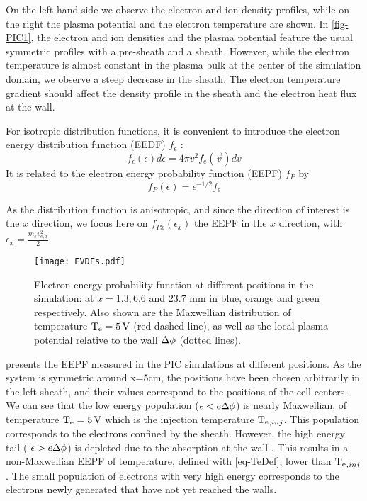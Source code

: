    On the left-hand side we observe the electron and ion density profiles, while on the right the plasma potential and the electron temperature are shown.
    In \cref{fig-PIC1}, the electron and ion densities and the plasma potential feature the usual symmetric profiles with a pre-sheath and a sheath.
    However, while the electron temperature is almost constant in the plasma bulk at the center of the simulation domain, we observe a steep decrease in the sheath.
    The electron temperature gradient should affect the density profile in the sheath and the electron heat flux at the wall.

    \vspace{1em}
    For isotropic distribution functions, it is convenient to introduce the electron energy distribution function (EEDF) $f_{\epsilon}$ \citep{chabert2011}:
    \begin{equation}
    f_{\epsilon}(\epsilon) d\epsilon = 4 \pi v^2 f_e(\vec{v}) dv
    \end{equation}
    It is related to the electron energy probability function (EEPF) $f_{P}$ by
    \begin{equation}
    f_{P}(\epsilon) = \epsilon^{-1/2} f_{\epsilon}
    \end{equation}

    As the distribution function is anisotropic, and since the direction of interest is the $x$ direction, we focus here on $f_{P x}(\epsilon_x)$ the EEPF in the $x$ direction, with $\epsilon_x = \frac{m_e v_{e,x}^2}{2}$.


    \begin{figure}[!htbp]
      \centering
      \texttt{[image: EVDFs.pdf]}
      \caption{Electron energy probability function at different positions in the simulation: at $x=1.3,6.6$ and $23.7$ mm in blue, orange and green respectively. Also shown are the Maxwellian distribution of temperature $\mathrm{T_e}=5{\mathrm{\,V}}$ (red dashed line), as well as the local plasma potential relative to the wall $\Delta \phi$ (dotted lines). }

      \label{fig-PIC2}
    \end{figure}

     presents the EEPF measured in the PIC simulations at different positions.
    As the system is symmetric around x=5cm, the positions have been chosen arbitrarily in the left sheath, and their values correspond to the positions of the cell centers.
    We can see that the low energy population ($\epsilon < e \Delta \phi$) is nearly Maxwellian, of temperature $\mathrm{T_e} = 5{\mathrm{\,V}}$ which is the injection temperature $\mathrm{T_e}_{, inj}$.
    This population corresponds to the electrons confined by the sheath.
    However, the high energy tail ( $\epsilon > e\Delta \phi$) is depleted due to the absorption at the wall \citep{meige2006a,kaganovich2007,lafleur2011}.
    This results in a  non-Maxwellian EEPF of temperature, defined with \cref{eq-TeDef}, lower than $\mathrm{T_e}_{, inj}$.
    The small population of electrons with very high energy corresponds to the electrons newly generated that have not yet reached the walls.



